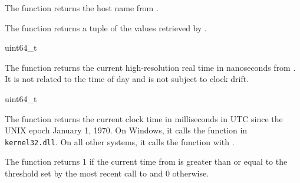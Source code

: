 The  function returns the host name from
.

\begin{function}
\end{function}

The  function returns a  tuple
of the values retrieved by .

\label{uname-tuple}
\begin{tuple}\end{tuple}\antipar
\begin{argtbl}
\end{argtbl}

\begin{function}
  uint64\_t 
\end{function}

The  function returns the current
high-resolution real time in nanoseconds from . It is
not related to the time of day and is not subject to clock drift.

\begin{function}
  uint64\_t 
\end{function}

The  function returns the current clock time in
milliseconds in UTC since the UNIX epoch January 1, 1970. On Windows,
it calls the  function in
\texttt{kernel32.dll}. On all other systems, it calls the
 function with .

\begin{function}
\end{function}

The  function returns 1 if the current time
from  is greater than or equal to the threshold set
by the most recent call to  and 0 otherwise.

\begin{function}
\end{function}

